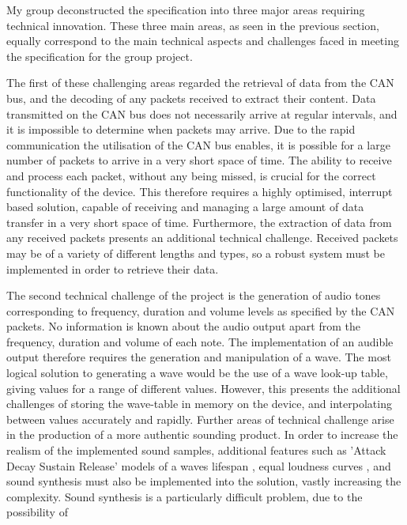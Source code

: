 My group deconstructed the specification into three major areas requiring 
technical innovation. 
These three main areas, as seen in the previous section, 
equally correspond to the main technical aspects and challenges faced in 
meeting the specification for the group project. 
\par\bigskip\noindent
The first of these challenging areas regarded the retrieval of data from the CAN 
bus, and the decoding of any packets received to extract their content. 
Data transmitted on the CAN bus does not necessarily arrive at regular intervals, 
and it is impossible to determine when packets may arrive.
Due to the rapid communication the utilisation of the CAN bus enables, it is 
possible for a large number of packets to arrive in a very short space of time.
The ability to receive and process each packet, without any being missed, is 
crucial for the correct functionality of the device. 
This therefore requires a highly optimised, interrupt based solution, capable of
receiving and managing a large amount of data transfer in a very short space of
time. 
Furthermore, the extraction of data from any received packets presents an 
additional technical challenge. 
Received packets may be of a variety of different lengths and types, so a robust 
system must be implemented in order to retrieve their data. 
\par\bigskip\noindent
The second technical challenge of the project is the generation of audio tones 
corresponding to frequency, duration and volume levels as specified by the CAN 
packets. 
No information is known about the audio output  apart from the frequency, 
duration and volume of each note. 
The implementation of an audible output therefore requires the generation and 
manipulation of a wave. 
The most logical solution to generating a wave would be the use of a wave look-up 
table, giving values for a range of different values. 
However, this presents the additional challenges of storing the wave-table in memory 
on the device, and interpolating between values accurately and rapidly. 
Further areas of technical challenge arise in the production of a more authentic 
sounding product. 
In order to increase the realism of the implemented sound samples, additional 
features such as 'Attack Decay 
Sustain Release' models of a waves lifespan \cite{asr-book}, equal loudness 
curves \cite{kefauver2001audio}, and sound synthesis \cite{miranda2012computer} 
must also be implemented into the solution, vastly increasing the complexity. 
Sound synthesis is a particularly difficult problem, due to the possibility of 

